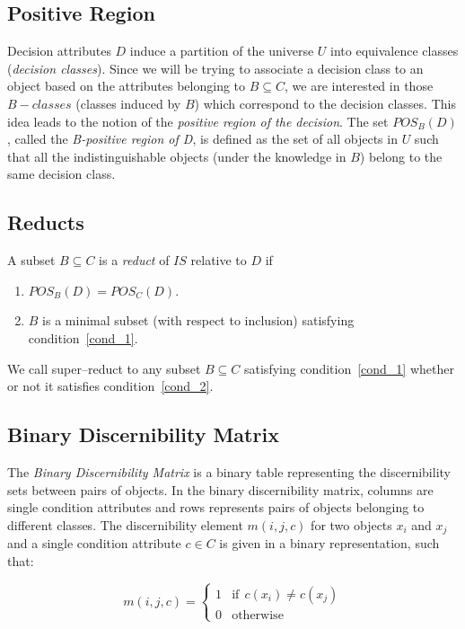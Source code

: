 \documentclass[number,preprint,review,12pt]{elsarticle}
\begin{document}
\subsection{Positive Region}\label{subsect_Pos}
  Decision attributes $D$ induce a partition of the universe $U$ into equivalence classes (\textit{decision classes}). Since we will be trying to associate a decision class to an object based on the attributes belonging to $B \subseteq C$, we are interested in those $B-classes$ (classes induced by $B$) which correspond to the decision classes. This idea leads to the notion of the  \textit{positive region of the decision}. The set $POS_B(D)$, called the \textit{B-positive region of D}, is defined as the set of all objects in $U$ such that all the indistinguishable objects (under the knowledge in $B$) belong to the same decision class.
 
\subsection{Reducts}\label{def_reduct}
  A subset $B \subseteq C$ is a \textit{reduct} of $IS$ relative to $D$ if
  \begin{enumerate}
  	\item $POS_B(D)=POS_C(D)$. \label{cond_1}
  	\item $B$ is a minimal subset (with respect to inclusion) satisfying condition~\ref{cond_1}.\label{cond_2}
  \end{enumerate}

  We call super--reduct to any subset $B \subseteq C$ satisfying condition~\ref{cond_1} whether or not it satisfies
  condition~\ref{cond_2}.
  
%  
\subsection{Binary Discernibility Matrix}
  The \textit{Binary Discernibility Matrix} is a binary table representing the discernibility sets between pairs 
  of objects. In the binary discernibility matrix, columns are single condition attributes and rows represents pairs of objects belonging to different classes. The discernibility element $m(i, j, c)$ for two objects $x_i$ and $x_j$ and a single condition attribute $c \in C$ is given in a binary representation, such that:
  
  \begin{equation}
  	m(i, j, c)=\left\lbrace\begin{array}{cl}
  			1 & \mathrm{if~~}c(x_i) \neq c(x_j) \\
  			0 								   & \mathrm{otherwise} 
  	\end{array}\right.
  \end{equation} 
  
\end{document}
